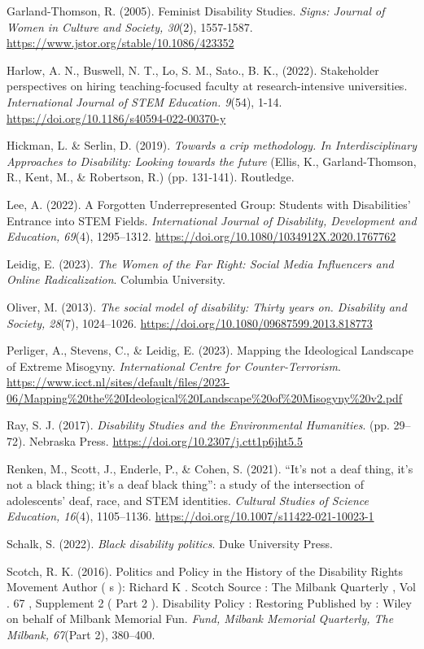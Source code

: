 \documentclass{sig-alternate} %
\begin{document}
Garland-Thomson, R. (2005). Feminist Disability Studies. \textit{Signs: Journal of Women in Culture and Society, 30}(2), 1557-1587. \url{https://www.jstor.org/stable/10.1086/423352}

Harlow, A. N., Buswell, N. T., Lo, S. M., Sato., B. K., (2022). Stakeholder perspectives on hiring teaching-focused faculty at research-intensive universities. \textit{International Journal of STEM Education. 9}(54), 1-14. \url{https://doi.org/10.1186/s40594-022-00370-y}

Hickman, L. \& Serlin, D. (2019). \textit{Towards a crip methodology. In Interdisciplinary Approaches to Disability: Looking towards the future} (Ellis, K., Garland-Thomson, R., Kent, M., \& Robertson, R.) (pp. 131-141). Routledge.

Lee, A. (2022). A Forgotten Underrepresented Group: Students with Disabilities’ Entrance into STEM Fields. \textit{International Journal of Disability, Development and Education, 69}(4), 1295–1312. \url{https://doi.org/10.1080/1034912X.2020.1767762}

Leidig, E. (2023). \textit{The Women of the Far Right: Social Media Influencers and Online Radicalization}. Columbia University.

Oliver, M. (2013). \textit{The social model of disability: Thirty years on. Disability and Society, 28}(7), 1024–1026. \url{https://doi.org/10.1080/09687599.2013.818773}

Perliger, A., Stevens, C., \& Leidig, E. (2023). Mapping the Ideological Landscape of Extreme Misogyny. \textit{International Centre for Counter-Terrorism}. \url{https://www.icct.nl/sites/default/files/2023-06/Mapping%20the%20Ideological%20Landscape%20of%20Misogyny%20v2.pdf}

Ray, S. J. (2017). \textit{Disability Studies and the Environmental Humanities}. (pp. 29–72). Nebraska Press. \url{https://doi.org/10.2307/j.ctt1p6jht5.5}

Renken, M., Scott, J., Enderle, P., \& Cohen, S. (2021). “It’s not a deaf thing, it’s not a black thing; it’s a deaf black thing”: a study of the intersection of adolescents’ deaf, race, and STEM identities. \textit{Cultural Studies of Science Education, 16}(4), 1105–1136. \url{https://doi.org/10.1007/s11422-021-10023-1}

Schalk, S. (2022). \textit{Black disability politics}. Duke University Press.

Scotch, R. K. (2016). Politics and Policy in the History of the Disability Rights Movement Author ( s ): Richard K . Scotch Source : The Milbank Quarterly , Vol . 67 , Supplement 2 ( Part 2 ). Disability Policy : Restoring Published by : Wiley on behalf of Milbank Memorial Fun. \textit{Fund, Milbank Memorial Quarterly, The Milbank, 67}(Part 2), 380–400.
\end{document}
